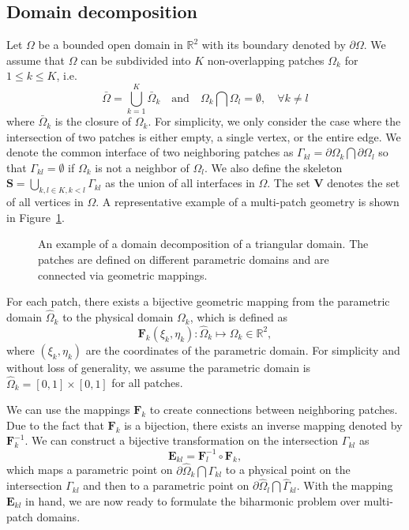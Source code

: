 \subsection{Domain decomposition}\label{sec:domain_decompostion}

Let $\Omega$ be a bounded open domain in $\mathbb{R}^2$ with its boundary denoted by $\partial\Omega$. We assume that $\Omega$ can be subdivided into $K$ non-overlapping patches $\Omega_k$ for $1\leq{}k\leq{}K$, i.e.
\begin{equation}
  \bar{\Omega} = \bigcup_{k=1}^{K} \bar{\Omega}_{k}  \quad \textrm{and} \quad {\Omega}_{k}\bigcap{\Omega}_{l}=\emptyset, \quad \forall k\neq{l}
\end{equation}
where $\bar{\Omega}_k$ is the closure of $\Omega_k$. For simplicity, we only consider the case where the intersection of two patches is either empty, a single vertex, or the entire edge. We denote the common interface of two neighboring patches as $\Gamma_{kl} = \partial{\Omega}_k\bigcap\partial{\Omega}_l$ so that $\Gamma_{kl}=\emptyset$ if $\Omega_k$ is not a neighbor of $\Omega_l$. We also define the skeleton $\mathbf{S}=\bigcup_{k,l\in{K}, k<{l}}\Gamma_{kl}$ as the union of all interfaces in $\Omega$. The set $\mathbf{V}$ denotes the set of all vertices in $\Omega$. A representative example of a multi-patch geometry is shown in Figure~\ref{fig:partition}.

\begin{figure}[ht]
  \center
  
  \caption{An example of a domain decomposition of a triangular domain. The patches are defined on different parametric domains and are connected via geometric mappings.}
  \label{fig:partition}
\end{figure}

For each patch, there exists a bijective geometric mapping from the parametric domain $\hat{\Omega}_k$ to the physical domain $\Omega_k$, which is defined as
\begin{equation}
  \mathbf{F}_{k}\left(\xi_{k},\eta_{k}\right)\colon{\hat{\Omega}_k}\mapsto{{\Omega}_k}\in\mathbb{R}^2,
\end{equation}
where $\left(\xi_{k},\eta_{k}\right)$ are the coordinates of the parametric domain. For simplicity and without loss of generality, we assume the parametric domain is ${\hat{\Omega}_k}=\left[{0,1}\right]\times\left[{0,1}\right]$ for all patches.

We can use the mappings $\mathbf{F}_k$ to create connections between neighboring patches. Due to the fact that $\mathbf{F}_k$ is a bijection, there exists an inverse mapping denoted by $\mathbf{F}^{-1}_k$. We can construct a bijective transformation on the intersection $\Gamma_{kl}$ as
\begin{equation}
  \mathbf{E}_{kl}=\mathbf{F}_{l}^{-1}\circ\mathbf{F}_{k},
\end{equation}
which maps a parametric point on $\partial{\hat{\Omega}}_k\bigcap \hat{\Gamma}_{kl}$ to a physical point on the intersection $\Gamma_{kl}$ and then to a parametric point on $\partial{\hat{\Omega}}_l\bigcap \hat{\Gamma}_{kl}$. With the mapping $\mathbf{E}_{kl}$ in hand, we are now ready to formulate the biharmonic problem over multi-patch domains.

